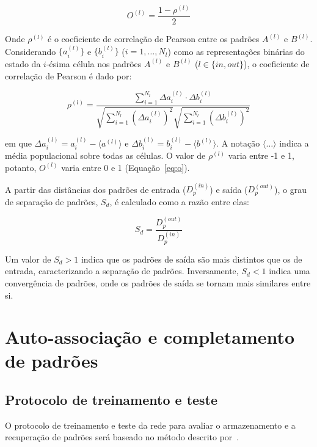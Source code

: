 \begin{equation}
    \label{eq:o}
    O^{(l)} = \frac{1 - \rho^{(l)}}{2}
\end{equation}

Onde $\rho^{(l)}$ é o coeficiente de correlação de Pearson entre os padrões $A^{(l)}$ e $B^{(l)}$.
Considerando $\{a_i^{(l)}\}$ e $\{b_i^{(l)}\}$ ($i=1, \dots, N_l$) como as representações binárias do estado da $i$-ésima célula nos padrões $A^{(l)}$ e $B^{(l)}$ ($l \in \{in, out\}$), o coeficiente de correlação de Pearson é dado por:

\begin{equation}
    \label{eq:pearson}
    \rho^{(l)} = \frac{\sum_{i=1}^{N_l} \Delta a_i^{(l)} \cdot \Delta b_i^{(l)}}{\sqrt{\sum_{i=1}^{N_l} (\Delta a_i^{(l)})^2} \sqrt{\sum_{i=1}^{N_l} (\Delta b_i^{(l)})^2}}
\end{equation}

em que $\Delta a_i^{(l)} = a_i^{(l)} - \langle a^{(l)} \rangle$ e $\Delta b_i^{(l)} = b_i^{(l)} - \langle b^{(l)} \rangle$. A
notação $\langle \dots \rangle$ indica a média populacional sobre todas as células. O valor de $\rho^{(l)}$ varia entre -1 e 1,
potanto, $O^{(l)}$ varia entre 0 e 1 (Equação~\ref{eq:o}).

A partir das distâncias dos padrões de entrada ($D_p^{(in)}$) e saída ($D_p^{(out)}$), o grau de separação de padrões, $S_d$, é calculado como a razão entre elas:

\begin{equation}
    \label{eq:sd}
    S_d = \frac{D_p^{(out)}}{D_p^{(in)}}
\end{equation}

Um valor de $S_d > 1$ indica que os padrões de saída são mais distintos que os de entrada, caracterizando a separação de padrões. Inversamente, $S_d < 1$ indica uma convergência de padrões, onde os padrões de saída se tornam mais similares entre si.

\section{Auto-associação e completamento de padrões}

\subsection{Protocolo de treinamento e teste}\label{sec:protocolo_treinamento_teste}

O protocolo de treinamento e teste da rede para avaliar o armazenamento e a recuperação de padrões será baseado no método descrito
por~\cite{kopsickFormation2024}.

